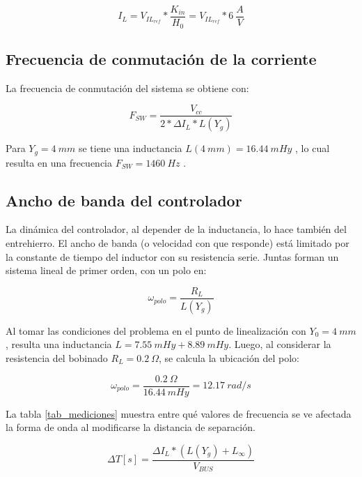 \begin{equation} 
I_L = V_{IL_{ref}} * \frac{K_{in}}{H_0} = V_{IL_{ref}} * 6\:\frac{A}{V}
\end{equation}

\subsection{Frecuencia de conmutación de la corriente}

\noindent La frecuencia de conmutación del sistema se obtiene con:

\begin{equation}\label{eq_frec-sw} 
F_{SW} = \frac{V_{cc}}{2*\Delta I_L * L(Y_g)}
\end{equation}

\noindent Para $Y_g = 4 \:mm $ se tiene una inductancia $L(4\:mm) = 16.44 \:mHy$ , lo cual resulta en una frecuencia $F_{SW }= 1460 \:Hz$ .

\subsection{Ancho de banda del controlador}\label{esccion_AB_Controlador} 

\noindent La dinámica del controlador, al depender de la inductancia, lo hace también del entrehierro. El ancho de banda (o velocidad con que responde) está limitado por la constante de tiempo del inductor con su resistencia serie. Juntas forman un sistema lineal de primer orden, con un polo en: 

\begin{equation} \label{eq_frec-angular}
\omega _{polo} = \frac{R_L}{L(Y_g)}
\end{equation}

\noindent Al tomar las condiciones del problema en el punto de linealización con $Y_{0}=4\:mm$, resulta una inductancia $L = 7.55 \:mHy + 8.89 \:mHy$. Luego, al considerar la resistencia del bobinado $R_L=0.2\:\Omega$, se calcula la ubicación del polo:

\begin{equation} 
\omega _{polo} = \frac{0.2\:\Omega}{16.44 \:mHy} = 12.17 \:rad/s
\end{equation}

\noindent La tabla \ref{tab_mediciones} muestra  entre qué valores de frecuencia se ve afectada la forma de onda al modificarse la distancia de separación.

\begin{equation} \label{eq_DeltaT}
\Delta T [s] = \frac{\Delta I_L * (L(Y_g) + L_{\infty})}{V_{BUS}}
\end{equation}

